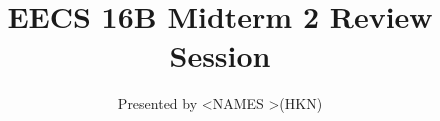 

\title{EECS 16B Midterm 2 Review Session}
\author{Presented by \textless NAMES \textgreater (HKN)}
\date{}

\newcommand{\SlideAccessingLogistics}{@\#}










